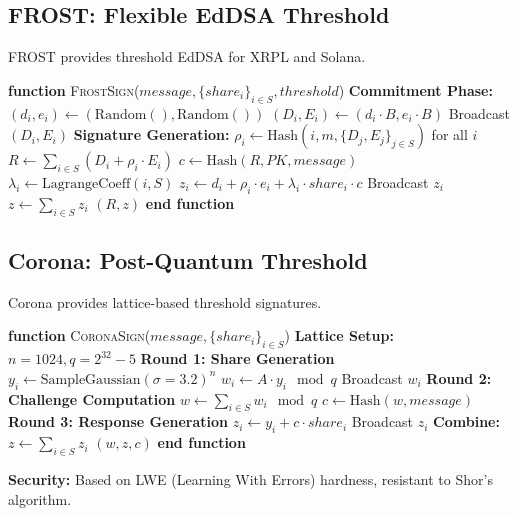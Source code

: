 \subsection{FROST: Flexible EdDSA Threshold}

FROST \cite{frost} provides threshold EdDSA for XRPL and Solana.



\begin{algorithmic}[1]
\State \textbf{function} \textsc{FrostSign}($message, \{share_i\}_{i \in S}, threshold$)
    \State \textbf{Commitment Phase:}
        \State $(d_i, e_i) \gets (\text{Random}(), \text{Random}())$
        \State $(D_i, E_i) \gets (d_i \cdot B, e_i \cdot B)$ 
        \State Broadcast $(D_i, E_i)$
    \EndFor
    \State
    \State \textbf{Signature Generation:}
    \State $\rho_i \gets \text{Hash}(i, m, \{D_j, E_j\}_{j \in S})$ for all $i$
    \State $R \gets \sum_{i \in S} (D_i + \rho_i \cdot E_i)$
    \State $c \gets \text{Hash}(R, PK, message)$
        \State $\lambda_i \gets \text{LagrangeCoeff}(i, S)$
        \State $z_i \gets d_i + \rho_i \cdot e_i + \lambda_i \cdot share_i \cdot c$
        \State Broadcast $z_i$
    \EndFor
    \State $z \gets \sum_{i \in S} z_i$
    \State \Return $(R, z)$ 
\State \textbf{end function}
\end{algorithmic}


\subsection{Corona: Post-Quantum Threshold}

Corona \cite{corona} provides lattice-based threshold signatures.



\begin{algorithmic}[1]
\State \textbf{function} \textsc{CoronaSign}($message, \{share_i\}_{i \in S}$)
    \State \textbf{Lattice Setup:} $n = 1024, q = 2^{32} - 5$
    \State
    \State \textbf{Round 1: Share Generation}
        \State $y_i \gets \text{SampleGaussian}(\sigma = 3.2)^n$
        \State $w_i \gets A \cdot y_i \mod q$ 
        \State Broadcast $w_i$
    \EndFor
    \State
    \State \textbf{Round 2: Challenge Computation}
    \State $w \gets \sum_{i \in S} w_i \mod q$
    \State $c \gets \text{Hash}(w, message)$ 
    \State
    \State \textbf{Round 3: Response Generation}
        \State $z_i \gets y_i + c \cdot share_i$
        \State Broadcast $z_i$
    \EndFor
    \State
    \State \textbf{Combine:}
    \State $z \gets \sum_{i \in S} z_i$
    \State \Return $(w, z, c)$ 
\State \textbf{end function}
\end{algorithmic}


\textbf{Security:} Based on LWE (Learning With Errors) hardness, resistant to Shor's algorithm.

